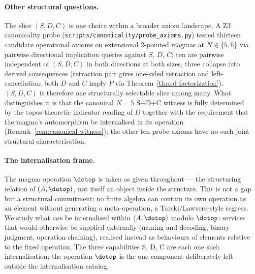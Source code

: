 \paragraph{Other structural questions.} The slice $(S, D, C)$ is one
choice within a broader axiom landscape. A Z3 canonicality probe
(\texttt{scripts/canonicality/probe\_axioms.py}) tested thirteen
candidate operational axioms on extensional 2-pointed magmas at
$N \in \{5, 6\}$ via pairwise directional implication queries against
$S$, $D$, $C$; ten are pairwise independent of $(S, D, C)$ in both
directions at both sizes, three collapse into derived consequences
(retraction pair gives one-sided retraction and left-cancellation; both
$D$ and $C$ imply $P$ via Theorem~\ref{thm:d-factorization}). $(S, D, C)$
is therefore one structurally selectable slice among many. What
distinguishes it is that the canonical $N = 5$ S+D+C witness is fully
determined by the topos-theoretic indicator reading of $D$ together with
the requirement that the magma's automorphism be internalised in its
operation (Remark~\ref{rem:canonical-witness}); the other ten probe
axioms have no such joint structural characterisation.

\paragraph{The internalisation frame.}
The magma operation $\dotop$ is taken as given throughout --- the
structuring relation of $(A, \dotop)$, not itself an object inside the
structure. This is not a gap but a structural commitment: no finite
algebra can contain its own operation as an element without generating
a meta-operation, a Tarski/Lawvere-style regress. We study what
\emph{can} be internalised within $(A, \dotop)$ modulo $\dotop$:
services that would otherwise be supplied externally (naming and
decoding, binary judgment, operation chaining), realised instead as
behaviours of elements relative to the fixed operation. The three
capabilities S, D, C are each one such internalisation; the operation
$\dotop$ is the one component deliberately left outside the
internalisation catalog.
